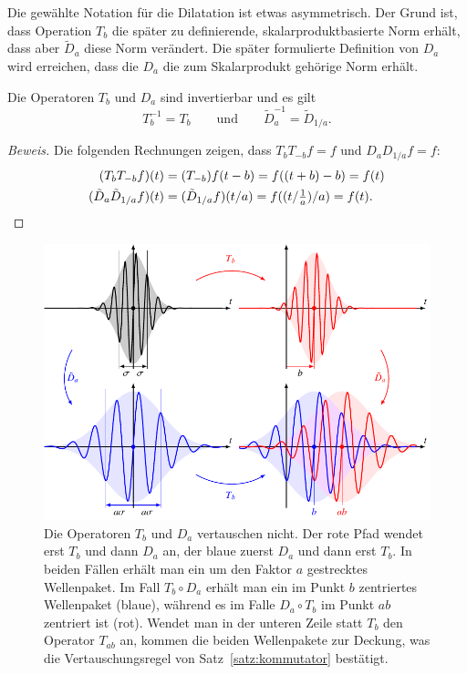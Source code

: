 Die gewählte Notation für die Dilatation ist etwas asymmetrisch.
Der Grund ist, dass Operation $T_b$ die später zu definierende,
skalarproduktbasierte Norm erhält, dass aber $\tilde{D}_a$ diese Norm
verändert.
Die später formulierte Definition von $D_a$ wird erreichen, dass 
die $D_a$ die zum Skalarprodukt gehörige Norm erhält.

\begin{satz}
\label{geometrie:satz:inverse}
Die Operatoren $T_b$ und $D_a$ sind invertierbar und es gilt
\[
T_b^{-1} = T_b
\qquad\text{und}\qquad
\tilde{D}_a^{-1} = \tilde{D}_{1/a}.
\]
\end{satz}

\begin{proof}[Beweis]
Die folgenden Rechnungen zeigen, dass $T_bT_{-b}f=f$ und $D_aD_{1/a}f=f$:
\begin{align*}
(T_bT_{-b}f)(t)
&=
(T_{-b})f(t-b)
=
f((t+b)-b)
=
f(t)
\\
(\tilde{D}_a\tilde{D}_{1/a}f)(t)
&=
(\tilde{D}_{1/a}f)(t/a)
=
f((t/{\textstyle\frac1a})/a)
=
f(t).
\qedhere
\end{align*}
\end{proof}

\begin{figure}
\centering
\includegraphics[width=\hsize]{chapters/1-geometrie/images/kommutator.pdf}
\caption{Die Operatoren $T_b$ und $D_a$ vertauschen nicht.
Der rote Pfad wendet erst $T_b$ und dann $D_a$ an, der blaue zuerst
$D_a$ und dann erst $T_b$.
In beiden Fällen erhält man ein um den Faktor $a$ gestrecktes
Wellenpaket.
Im Fall $T_b\circ D_a$ erhält man ein im Punkt $b$ zentriertes Wellenpaket
(blaue), während es im Falle $D_a\circ T_b$ im Punkt $ab$ zentriert ist (rot).
Wendet man in der unteren Zeile statt $T_b$ den Operator $T_{ab}$ an, 
kommen die beiden Wellenpakete zur Deckung, was die Vertauschungsregel
von Satz~\ref{satz:kommutator} bestätigt.
\label{geometrie:kommutator:image}}
\end{figure}


